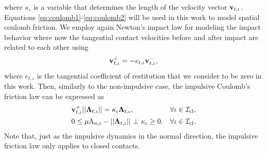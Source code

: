\documentclass[../DC2019003Bouma.tex]{subfiles}
\begin{document}
where $\kappa_{\iota}$ is a variable that determines the length of the velocity vector $\mathbf{v}_{t,\iota}$. Equations \eqref{eq:coulomb1}-\eqref{eq:coulomb2} will be used in this work to model spatial coulomb friction. We employ again Newton's impact law for modeling the impact behavior where now the tangential contact velocities before and after impact are related to each other using
\begin{align}
\mathbf{v}^+_{t,\iota} = -e_{t,\iota}\mathbf{v}^-_{t,\iota},
\end{align}
where $e_{t,\iota}$ is the tangential coefficient of restitution that we consider to be zero in this work. Then, similarly to the non-impulsive case, the impulsive Coulomb's friction law can be expressed as
\begin{align}
&\vbf_{t,\iota}^+||\Lambdab_{t,\iota}|| = \kappa_{\iota}\Lambdab_{t,\iota},  &\forall \iota\in\Ic_{\text{cl}},\label{eq:coulombimp1}\\
&0 \leq \mu\Lambda_{n,\iota} - ||\Lambdab_{t,\iota}||\ \bot\ \kappa_{\iota} \geq 0. &\forall \iota\in\Ic_{\text{cl}}.\label{eq:coulombimp2}
\end{align}
Note that, just as the impulsive dynamics in the normal direction, the impulsive friction law only applies to closed contacts.
\end{document}
